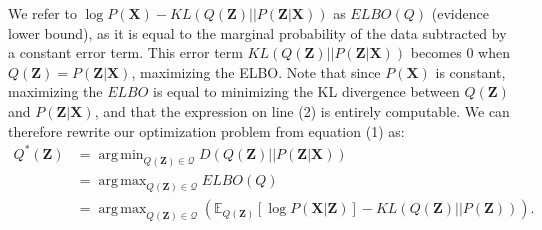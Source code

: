 \documentclass[a4paper,12pt]{article}
\DeclareMathOperator*{\argmin}{arg\,min}
\DeclareMathOperator*{\argmax}{arg\,max}
\begin{document}
We refer to $\log P(\textbf{X})-KL(Q(\textbf{Z})||P(\textbf{Z}|\textbf{X}))$ as $ELBO(Q)$ (evidence lower bound), as it is equal to the marginal probability of the data subtracted by a constant error term. This error term $KL(Q(\textbf{Z})||P(\textbf{Z}|\textbf{X}))$ becomes 0 when $Q(\textbf{Z})=P(\textbf{Z}|\textbf{X})$, maximizing the ELBO. Note that since $P(\textbf{X})$ is constant, maximizing the $ELBO$ is equal to minimizing the KL divergence between $Q(\textbf{Z})$ and $P(\textbf{Z}|\textbf{X})$, and that the expression on line (2) is entirely computable. We can therefore rewrite our optimization problem from equation (1) as:
\begin{align*}
Q^*(\textbf{Z})&=\argmin_{Q(\textbf{Z})\in \mathcal{Q}}D(Q(\textbf{Z})||P(\textbf{Z}|\textbf{X}))\\
&= \argmax_{Q(\textbf{Z})\in \mathcal{Q}} ELBO(Q)\\
&= \argmax_{Q(\textbf{Z})\in \mathcal{Q}} \left(\mathbb{E}_{Q(\textbf{Z})}[\log P(\textbf{X}|\textbf{Z})]-KL(Q(\textbf{Z})||P(\textbf{Z}))\right).
\end{align*}
\end{document}
